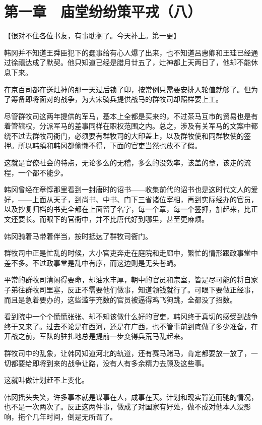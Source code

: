 \section{第一章　庙堂纷纷策平戎（八）}

【很对不住各位书友，有事耽搁了。今天补上。第一更】

韩冈并不知道王舜臣犯下的蠢事给有心人爆了出来，也不知道吕惠卿和王珪已经通过徐禧达成了默契。他只知道已经是腊月廿五了，灶神都上天两日了，他却不能休息下来。

在京百司都在送灶神的那一天过后锁了印，按常例只需要安排人轮值就够了。但为了筹备即将面对的战争，为大宋骑兵提供战马的群牧司却照样要上工。

尽管群牧司这两年提供的军马，基本上全都是买来的，不过茶马互市的贸易也是有着管辖权，分派军马的差事同样在职权范围之内。总之，涉及有关军马的文案中都绕不过去群牧司衙门，必须要有群牧司的大印盖上，以及群牧使和同群牧使的签押。所以韩缜和韩冈都偷懒不得，下面的官吏当然也放不了假。

这就是官僚社会的特点，无论多么的无稽，多么的没效率，该盖的章，该走的流程，一个都不能少。

韩冈曾经在章惇那里看到一封唐时的诏书——收集前代的诏书也是这时代文人的爱好，——上面从天子，到尚书、中书、门下三省诸位宰相，再到实际经办的官员，以及抄复归档的书吏全都在上面留了名字，每一个章，每一个签押，加起来，比正文还要长。而眼下的官衙中，并不比唐代好到哪里，甚至更麻烦。

韩冈骑着马带着伴当，按时抵达了群牧司衙门。

群牧司中正是忙乱的时候，大小官吏奔走在庭院和走廊中，繁忙的情形跟政事堂中差不多。不过政事堂是乱中有序，而这边则是无头苍蝇。

平常的群牧司清闲得要命，却油水丰厚，朝中的官员和宗室，皆是尽可能的将自家子弟往群牧司里塞，反正不需要他们做事，知道领钱就行了。可眼下要做正经事，而且是急着要办的，这些滥竽充数的官员被逼得鸡飞狗跳，全都没了招数。

看到院中一个个慌慌张张、却不知该做什么好的官吏，韩冈终于真切的感受到战争终于又来了。过去不论是在西河，还是在广西，也不管事前到底做了多少准备，在开战之前，军队的驻扎地总是提前一步变得兵荒马乱起来。

群牧司中的乱象，让韩冈知道河北的轨道，还有赛马赌马，肯定都要放一放了，一切都要给即将到来的战争让路，没有人有多余精力去顾及这些事。

这就叫做计划赶不上变化。

韩冈摇头失笑，许多事本就是谋事在人，成事在天。计划和现实背道而驰的情况，也不是一次两次了。反正这两件事，做成了对国家有好处，做不成对他本人没影响，拖个几年时间，倒是无所谓了。

